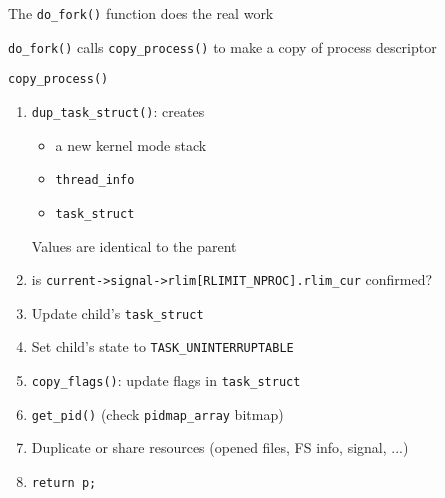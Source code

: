 \begin{frame}
  \begin{block}{The \texttt{do\_fork()} function does the real work}
    \begin{center}
    \end{center}
  \end{block}
\end{frame}

\begin{frame}
  \begin{block}{\texttt{do\_fork()} calls \texttt{copy\_process()} to make a copy of
      process descriptor}
    \begin{center}
    \end{center}
  \end{block}
\end{frame}

\begin{frame}
  \begin{block}{\texttt{copy\_process()}}
    \begin{enumerate}
    \item \texttt{dup\_task\_struct()}: creates
      \begin{itemize}
      \item a new kernel mode stack
      \item \texttt{thread\_info}
      \item \texttt{task\_struct}
      \end{itemize}
      Values are identical to the parent
    \item is \texttt{current->signal->rlim[RLIMIT\_NPROC].rlim\_cur} confirmed?
    \item Update child's \texttt{task\_struct}
    \item Set child's state to \texttt{TASK\_UNINTERRUPTABLE}
    \item \texttt{copy\_flags()}: update flags in \texttt{task\_struct}
     \item \texttt{get\_pid()} (check \texttt{pidmap\_array} bitmap)
    \item Duplicate or share resources (opened files, FS info, signal, ...)
    \item \texttt{return p;}
    \end{enumerate}
  \end{block}
\end{frame}

